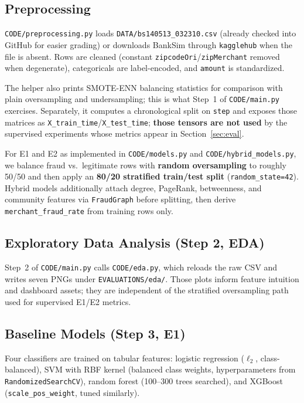 \documentclass[conference]{IEEEtran}
\begin{document}
\subsection{Preprocessing}

\texttt{CODE/preprocessing.py} loads \texttt{DATA/bs140513\_032310.csv} (already checked into GitHub for easier grading) or downloads BankSim through \texttt{kagglehub} when the file is absent. Rows are cleaned (constant \texttt{zipcodeOri}/\texttt{zipMerchant} removed when degenerate), categoricals are label-encoded, and \texttt{amount} is standardized.

The helper also prints SMOTE-ENN balancing statistics for comparison with plain oversampling and undersampling; this is what Step~1 of \texttt{CODE/main.py} exercises. Separately, it computes a chronological split on \texttt{step} and exposes those matrices as \texttt{X\_train\_time}/\texttt{X\_test\_time}; \textbf{those tensors are not used} by the supervised experiments whose metrics appear in Section~\ref{sec:eval}.

For E1 and E2 as implemented in \texttt{CODE/models.py} and \texttt{CODE/hybrid\_models.py}, we balance fraud vs.\ legitimate rows with \textbf{random oversampling} to roughly 50/50 and then apply an \textbf{80/20 stratified train/test split} (\texttt{random\_state=42}). Hybrid models additionally attach degree, PageRank, betweenness, and community features via \texttt{FraudGraph} before splitting, then derive \texttt{merchant\_fraud\_rate} from training rows only.

\subsection{Exploratory Data Analysis (Step 2, EDA)}

Step~2 of \texttt{CODE/main.py} calls \texttt{CODE/eda.py}, which reloads the raw CSV and writes seven PNGs under \texttt{EVALUATIONS/eda/}. Those plots inform feature intuition and dashboard assets; they are independent of the stratified oversampling path used for supervised E1/E2 metrics.

\subsection{Baseline Models (Step 3, E1)}

Four classifiers are trained on tabular features: logistic regression ($\ell_2$, class-balanced), SVM with RBF kernel (balanced class weights, hyperparameters from \texttt{RandomizedSearchCV}), random forest (100--300 trees searched), and XGBoost (\texttt{scale\_pos\_weight}, tuned similarly).
\end{document}
